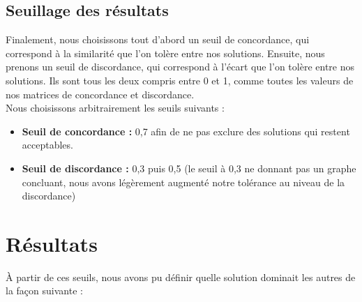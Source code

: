 \documentclass[paper=a4, fontsize=11pt]{report}
\numberwithin{equation}{section}		%
\numberwithin{figure}{section}			%
\numberwithin{table}{section}				%
\renewcommand{\bf}[1]{\textbf{#1}}
\begin{document}
\subsection{Seuillage des résultats}

Finalement, nous choisissons tout d’abord un seuil de concordance, qui correspond à la similarité que l’on tolère entre nos solutions. Ensuite, nous prenons un seuil de discordance, qui correspond à l’écart que l’on tolère entre nos solutions. Ils sont tous les deux compris entre 0 et 1, comme toutes les valeurs de nos matrices de concordance et discordance.\\

Nous choisissons arbitrairement les seuils suivants : \\

\begin{itemize}
\item \bf{Seuil de concordance :} 0,7 afin de ne pas exclure des solutions qui restent acceptables.
\item \bf{Seuil de discordance :} 0,3 puis 0,5 (le seuil à 0,3 ne donnant pas un graphe concluant, nous avons légèrement augmenté notre tolérance au niveau de la discordance)
\end{itemize}

\section{Résultats}

À partir de ces seuils, nous avons pu définir quelle solution dominait les autres de la façon suivante : \\

\\
\end{document}

